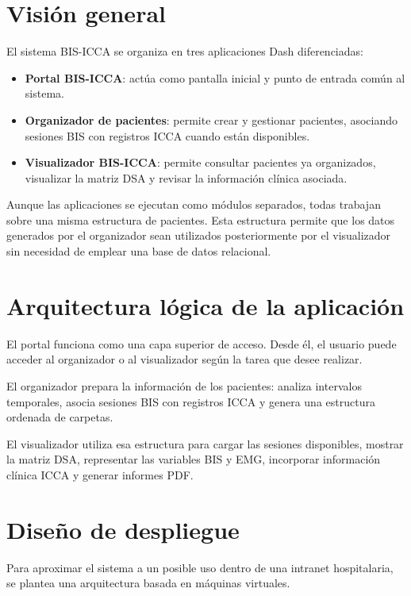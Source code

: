 \documentclass[
  spanish,
  a4paper,
  12pt,
  twoside]{memoir}
\providecommand{\tightlist}{%
  \setlength{\itemsep}{0pt}\setlength{\parskip}{0pt}}
\begin{document}
\section{Visión general}\label{visiuxf3n-general}

El sistema BIS-ICCA se organiza en tres aplicaciones Dash diferenciadas:

\begin{itemize}
\tightlist
\item
  \textbf{Portal BIS-ICCA}: actúa como pantalla inicial y punto de
  entrada común al sistema.
\item
  \textbf{Organizador de pacientes}: permite crear y gestionar
  pacientes, asociando sesiones BIS con registros ICCA cuando están
  disponibles.
\item
  \textbf{Visualizador BIS-ICCA}: permite consultar pacientes ya
  organizados, visualizar la matriz DSA y revisar la información clínica
  asociada.
\end{itemize}

Aunque las aplicaciones se ejecutan como módulos separados, todas
trabajan sobre una misma estructura de pacientes. Esta estructura
permite que los datos generados por el organizador sean utilizados
posteriormente por el visualizador sin necesidad de emplear una base de
datos relacional.

\section{Arquitectura lógica de la
aplicación}\label{arquitectura-luxf3gica-de-la-aplicaciuxf3n}

El portal funciona como una capa superior de acceso. Desde él, el
usuario puede acceder al organizador o al visualizador según la tarea
que desee realizar.

El organizador prepara la información de los pacientes: analiza
intervalos temporales, asocia sesiones BIS con registros ICCA y genera
una estructura ordenada de carpetas.

El visualizador utiliza esa estructura para cargar las sesiones
disponibles, mostrar la matriz DSA, representar las variables BIS y EMG,
incorporar información clínica ICCA y generar informes PDF.

\section{Diseño de despliegue}\label{diseuxf1o-de-despliegue}

Para aproximar el sistema a un posible uso dentro de una intranet
hospitalaria, se plantea una arquitectura basada en máquinas virtuales.
\end{document}
